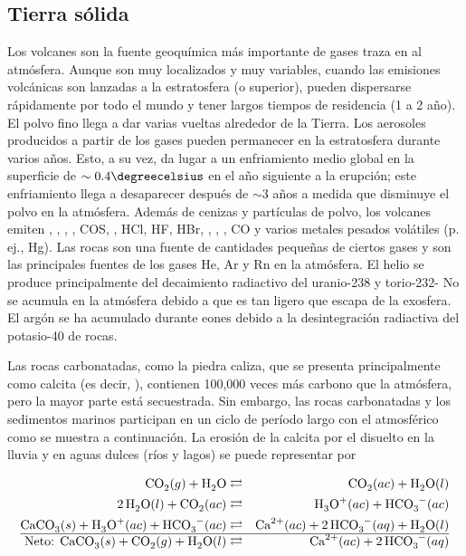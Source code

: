 \subsection{Tierra sólida}
Los volcanes son la fuente geoquímica más importante de gases traza en al atmósfera. Aunque son muy localizados y muy variables, cuando las emisiones volcánicas son lanzadas a la estratosfera (o superior), pueden dispersarse rápidamente por todo el mundo y tener largos tiempos de residencia (1 a 2 año). El polvo fino  llega a dar varias vueltas alrededor de la Tierra. Los aerosoles producidos a partir de los gases pueden permanecer en la estratosfera durante varios años. Esto, a su vez, da lugar a un enfriamiento medio global en la superficie de $\sim0.4\degreecelsius$ en el año siguiente a la erupción; este enfriamiento llega a desaparecer después de $\sim$3 años a medida que disminuye el polvo en la atmósfera. Además de cenizas y partículas de polvo, los volcanes emiten , , , , COS, , HCl, HF, HBr, , , , CO y varios metales pesados volátiles (p. ej., Hg). Las rocas son una fuente de  cantidades pequeñas de ciertos gases y son las principales fuentes de los gases He, Ar y Rn en la atmósfera. El helio se produce principalmente del decaimiento radiactivo del uranio-238 y torio-232- No se acumula en la atmósfera debido a que es tan ligero que escapa de la exosfera. El argón se ha acumulado durante eones debido a la desintegración radiactiva del potasio-40 de rocas.

Las rocas carbonatadas, como la piedra caliza, que se presenta principalmente como calcita (es decir, ), contienen 100,000 veces más carbono que la atmósfera, pero la mayor parte está secuestrada. Sin embargo, las rocas carbonatadas y los sedimentos marinos participan en un ciclo de período largo con el  atmosférico como se muestra a continuación. La erosión de la calcita por el  disuelto en la lluvia y en aguas dulces (ríos y lagos) se puede representar por

\begin{footnotesize}
\begin{eqnarray}
\ce{CO2}(g) + \ce{H2O} &\rightleftarrows& \ce{CO2}(ac) + \ce{H2O}(l)  \label{eq_co2h2o}\\
\ce{2H2O}(l) +   \ce{CO2}(ac)&\rightleftarrows&   \ce{H3O^+}(ac) +  \ce{HCO3^-}(ac) \label{eq_co2}\\
\ce{CaCO3}(s) +   \ce{H3O^+}(ac) +  \ce{HCO3^-}(ac) &\rightleftarrows& \ce{Ca^{2+}}(ac) + \ce{2HCO3^-}(aq) + \ce{H2O}(l)\label{eq_caco3}\\\hline
\textrm{Neto:       }   \ce{CaCO3}(s) +\ce{CO2}(g) + \ce{H2O}(l)  &\rightleftarrows&\ce{Ca^{2+}}(ac) + \ce{2HCO3^-}(aq)  \label{eq_cca}
\end{eqnarray}
\end{footnotesize}

